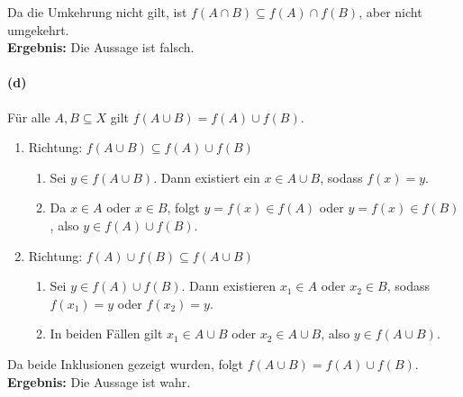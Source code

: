 \documentclass[12pt, letterpaper]{article}
\begin{document}
\noindent Da die Umkehrung nicht gilt, ist $f(A \cap B) \subseteq f(A) \cap f(B)$, aber nicht umgekehrt. \\

\noindent\textbf{Ergebnis:} Die Aussage ist falsch.\\

\paragraph{(d)} Für alle $A, B \subseteq X$ gilt $f(A \cup B) = f(A) \cup f(B)$.

\begin{enumerate}
    \item Richtung: $f(A \cup B) \subseteq f(A) \cup f(B)$
        \begin{enumerate}[label=$\circ$]
            \item Sei $y \in f(A \cup B)$. Dann existiert ein $x \in A \cup B$, sodass $f(x) = y$.
            \item Da $x \in A$ oder $x \in B$, folgt $y = f(x) \in f(A)$ oder $y = f(x) \in f(B)$, also $y \in f(A) \cup f(B)$.
        \end{enumerate}
    \item Richtung: $f(A) \cup f(B) \subseteq f(A \cup B)$
        \begin{enumerate}[label=$\circ$]
            \item Sei $y \in f(A) \cup f(B)$. Dann existieren $x_1 \in A$ oder $x_2 \in B$, sodass $f(x_1) = y$ oder $f(x_2) = y$.
            \item In beiden Fällen gilt $x_1 \in A \cup B$ oder $x_2 \in A \cup B$, also $y \in f(A \cup B)$.
        \end{enumerate}
\end{enumerate}

\noindent Da beide Inklusionen gezeigt wurden, folgt $f(A \cup B) = f(A) \cup f(B)$. \\

\noindent\textbf{Ergebnis:} Die Aussage ist wahr.
\end{document}
